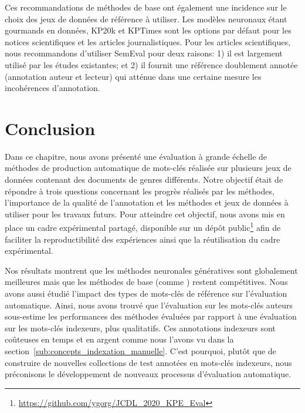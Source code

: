 Ces recommandations de méthodes de base ont également une incidence sur le choix des jeux de données de référence à utiliser.
%
Les modèles neuronaux étant gourmands en données, KP20k et KPTimes sont les options par défaut pour les notices scientifiques et les articles journalistiques.
%
Pour les articles scientifiques, nous recommandons d'utiliser SemEval pour deux raisons: 1) il est largement utilisé par les études existantes; et 2) il fournit une référence doublement annotée (annotation auteur et lecteur) qui atténue dans une certaine mesure les incohérences d'annotation.

\section{Conclusion}

Dans ce chapitre, nous avons présenté une évaluation à grande échelle de méthodes de production automatique de mots-clés réalisée sur plusieurs jeux de données contenant des documents de genres différents.
%
Notre objectif était de répondre à trois questions concernant les progrès réalisés par les méthodes, l'importance de la qualité de l'annotation et les méthodes et jeux de données à utiliser pour les travaux futurs. Pour atteindre cet objectif, nous avons mis en place un cadre expérimental partagé, disponible sur un dépôt public\footnote{\url{https://github.com/ygorg/JCDL_2020_KPE_Eval}} afin de faciliter la reproductibilité des expériences ainsi que la réutilisation du cadre expérimental.

Nos résultats montrent que les méthodes neuronales génératives sont globalement meilleures mais que les méthodes de base (comme \tfidf{}) restent compétitives.
Nous avons aussi étudié l'impact des types de mots-clés de référence sur l'évaluation automatique.
Ainsi, nous avons trouvé que l'évaluation sur les mots-clés auteurs sous-estime les performances des méthodes évaluées par rapport à une évaluation sur les mots-clés indexeurs, plus qualitatifs.
Ces annotations indexeurs sont coûteuses en temps et en argent comme nous l'avons vu dans la section~\ref{sub:concepts_indexation_manuelle}.
C'est pourquoi, plutôt que de construire de nouvelles collections de test annotées en mots-clés indexeurs, nous préconisons le développement de nouveaux processus d'évaluation automatique.

